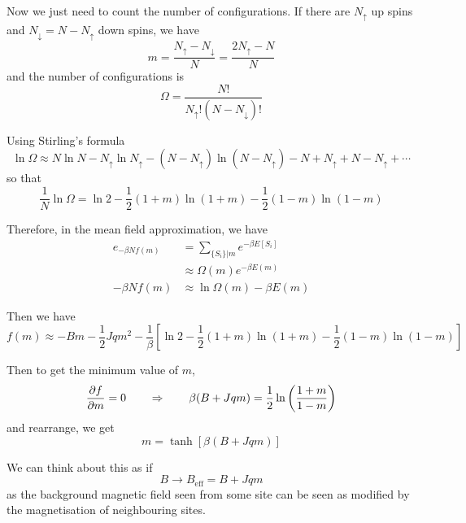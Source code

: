 \documentclass[a4paper,11pt]{article}
\begin{document}
	Now we just need to count the number of configurations. If there are $N_{\uparrow}$ up spins and $N_{\downarrow} = N - N_{\uparrow}$ down spins, we have
	\[
		m = \frac{N_{\uparrow} - N_\downarrow}{N} = \frac{2 N_\uparrow - N}{N}
	\]
	and the number of configurations is
	\[
		\Omega = \frac{N!}{N_\uparrow ! (N - N_\downarrow)!}
	\]
	
	Using Stirling's formula
	\[
		\ln \Omega \approx N \ln N - N_\uparrow \ln N_\uparrow - (N - N_\uparrow) \ln (N - N_\uparrow) - N + N_\uparrow + N - N_\uparrow + \cdots
	\]
	so that
	\[
		\frac{1}{N} \ln \Omega = \ln 2 - \frac{1}{2} (1+m)\ln(1+m) - \frac{1}{2} (1-m)\ln(1-m)
	\]
	
	Therefore, in the mean field approximation, we have
	\begin{align*}
		e_{-\beta N f(m)} & = \sum_{\{S_i\}|m} e^{-\beta E[S_i]}\\
		& \approx \Omega(m) e^{-\beta E(m)}\\
		- \beta N f(m) & \approx \ln \Omega(m) - \beta E(m)
	\end{align*}

	Then we have
	\[
		f(m) \approx - Bm - \frac{1}{2} J q m^2 - \frac{1}{\beta} \left[ \ln 2 - \frac{1}{2} (1+m)\ln(1+m) - \frac{1}{2} (1-m)\ln(1-m) \right]
	\]
	
	Then to get the minimum value of $m$,
	\[
		\pdv{f}{m} = 0 \qquad \Rightarrow\qquad \beta (B + Jqm) = \frac{1}{2} \ln \left( \frac{1+m}{1-m} \right)
	\]
	and rearrange, we get
	\[
		m = \tanh [\beta (B + Jqm)]
	\]
	
	We can think about this as if
	\[
		B \to B_{\text{eff}} = B + J q m
	\]
	as the background magnetic field seen from some site can be seen as modified by the magnetisation of neighbouring sites.
	
\end{document}
